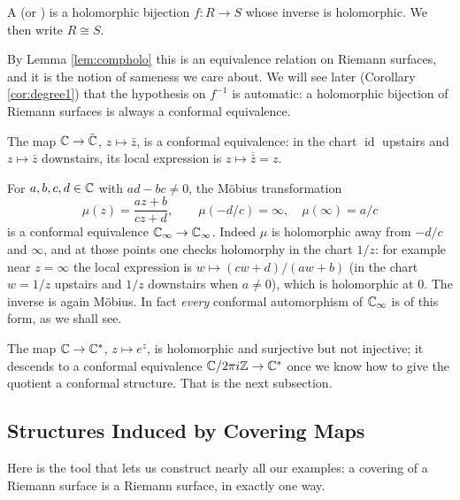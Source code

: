 \documentclass[a4paper]{scrartcl}
\newcommand{\id}{\operatorname{id}}
\newcommand{\Cinf}{\C_\infty}
\newcommand{\Cs}{\C^*}
\begin{document}
\begin{definition}
	A  (or ) is a holomorphic bijection
	$f : R \to S$ whose inverse is holomorphic. We then write $R \cong S$.
\end{definition}

By Lemma \ref{lem:compholo} this is an equivalence relation on Riemann surfaces, and it is
the notion of sameness we care about. We will see later (Corollary \ref{cor:degree1}) that
the hypothesis on $f^{-1}$ is automatic: a holomorphic bijection of Riemann surfaces is
always a conformal equivalence.

\begin{example}
	The map $\mathbb{C} \to \bar{\mathbb{C}}$, $z \mapsto \bar z$, is a conformal equivalence: in the chart
	$\id$ upstairs and $z \mapsto \bar z$ downstairs, its local expression is
	$z \mapsto \overline{\bar z} = z$.
\end{example}

\begin{example}\label{ex:mobius}
	For $a,b,c,d \in \mathbb{C}$ with $ad - bc \neq 0$, the M\"obius transformation
	$$
	\mu(z) = \frac{az+b}{cz+d}, \qquad \mu(-d/c) = \infty, \quad \mu(\infty) = a/c
	$$
	is a conformal equivalence $\Cinf \to \Cinf$. Indeed $\mu$ is holomorphic away from
	$-d/c$ and $\infty$, and at those points one checks holomorphy in the chart $1/z$: for
	example near $z = \infty$ the local expression is
	$w \mapsto (cw + d)/(aw+b)$ (in the chart $w = 1/z$ upstairs and $1/z$ downstairs when
	$a \ne 0$), which is holomorphic at $0$. The inverse is again M\"obius. In fact
	\emph{every} conformal automorphism of $\Cinf$ is of this form, as we shall see.
\end{example}

\begin{example}[$\Cs$ and the Cylinder]
	The map $\C \to \Cs$, $z \mapsto e^z$, is holomorphic and surjective but not injective;
	it descends to a conformal equivalence $\C / 2\pi i \Z \to \Cs$ once we know how to
	give the quotient a conformal structure. That is the next subsection.
\end{example}

\subsection{Structures Induced by Covering Maps}

Here is the tool that lets us construct nearly all our examples: a covering of a Riemann
surface is a Riemann surface, in exactly one way.
\end{document}
